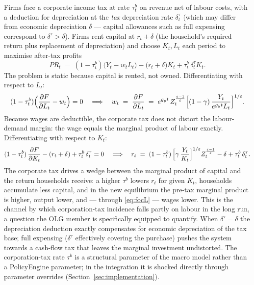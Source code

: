 Firms face a corporate income tax at rate $\tau^b_t$ on revenue net of labour costs, with a deduction for depreciation at the \emph{tax} depreciation rate $\delta^\tau_t$ (which may differ from economic depreciation $\delta$ --- capital allowances such as full expensing correspond to $\delta^\tau > \delta$). Firms rent capital at $r_t + \delta$ (the household's required return plus replacement of depreciation) and choose $K_t, L_t$ each period to maximise after-tax profits
\begin{equation}
\label{eq:profits}
PR_t \;=\; (1-\tau^b_t)\bigl(Y_t - w_t L_t\bigr) - \bigl(r_t + \delta\bigr)K_t + \tau^b_t\,\delta^\tau_t K_t .
\end{equation}
The problem is static because capital is rented, not owned. Differentiating with respect to $L_t$:
\begin{equation}
\label{eq:focL}
(1-\tau^b_t)\Bigl(\frac{\partial F}{\partial L_t} - w_t\Bigr) = 0
\quad\Longrightarrow\quad
w_t \;=\; \frac{\partial F}{\partial L_t}
\;=\; e^{g_y t}\,Z_t^{\frac{\varepsilon-1}{\varepsilon}}
\Bigl[(1-\gamma)\,\frac{Y_t}{e^{g_y t}L_t}\Bigr]^{1/\varepsilon} .
\end{equation}
Because wages are deductible, the corporate tax does not distort the labour-demand margin: the wage equals the marginal product of labour exactly. Differentiating with respect to $K_t$:
\begin{equation}
\label{eq:focK}
(1-\tau^b_t)\,\frac{\partial F}{\partial K_t} - (r_t+\delta) + \tau^b_t\,\delta^\tau_t = 0
\quad\Longrightarrow\quad
r_t \;=\; (1-\tau^b_t)\,\Bigl[\gamma\,\frac{Y_t}{K_t}\Bigr]^{1/\varepsilon} Z_t^{\frac{\varepsilon-1}{\varepsilon}} - \delta + \tau^b_t\,\delta^\tau_t .
\end{equation}
The corporate tax drives a wedge between the marginal product of capital and the return households receive: a higher $\tau^b$ lowers $r_t$ for given $K_t$, households accumulate less capital, and in the new equilibrium the pre-tax marginal product is higher, output lower, and --- through \eqref{eq:focL} --- wages lower. This is the channel by which corporation-tax incidence falls partly on labour in the long run, a question the OLG member is specifically equipped to quantify. When $\delta^\tau = \delta$ the depreciation deduction exactly compensates for economic depreciation of the tax base; full expensing ($\delta^\tau$ effectively covering the purchase) pushes the system towards a cash-flow tax that leaves the marginal investment undistorted. The corporation-tax rate $\tau^b$ is a structural parameter of the macro model rather than a PolicyEngine parameter; in the integration it is shocked directly through parameter overrides (Section~\ref{sec:implementation}).

